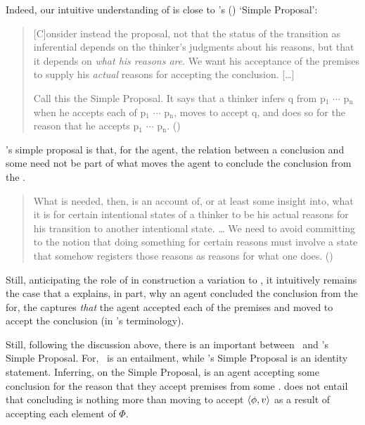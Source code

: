 \begin{note}
  Indeed, our intuitive understanding of \ros{} is close to \citeauthor{Wright:2014tt}'s (\citeyear{Wright:2014tt}) `Simple Proposal':
  \begin{quote}
    [C]onsider instead the proposal, not that the status of the transition as inferential depends on the thinker's judgments about his reasons, but that it depends on \emph{what his reasons are}.
    We want his acceptance of the premises to supply his \emph{actual} reasons for accepting the conclusion.
    [\dots]

    Call this the Simple Proposal.
    It says that a thinker infers q from p\(_{1}\) \(\cdots\) p\(_{\text{n}}\) when he accepts each of p\(_{1}\) \(\cdots\) p\(_{\text{n}}\), moves to accept q, and does so for the reason that he accepts p\(_{1}\) \(\cdots\) p\(_{\text{n}}\).%
    \mbox{}\hfill\mbox{(\citeyear[33]{Wright:2014tt})}
  \end{quote}

  \citeauthor{Wright:2014tt}'s simple proposal is that, for the agent, the relation between a conclusion and some \pool{} need not be part of what moves the agent to conclude the conclusion from the \pool{}.

  \begin{quote}
    What is needed, then, is an account of, or at least some insight into, what it is for certain intentional states of a thinker to be his actual reasons for his transition to another intentional state.
    \dots
    We need to avoid committing to the notion that doing something for certain reasons must involve a state that somehow registers those reasons as reasons for what one does.\newline
    \mbox{}\hfill\mbox{(\citeyear[34]{Wright:2014tt})}
  \end{quote}

  Still, anticipating the role of \ros{} in construction a variation to \qWhy{}, it intuitively remains the case that a \ros{} explains, in part, why an agent concluded the conclusion from the \pool{} for, the \ros{} captures \emph{that} the agent accepted each of the premises and moved to accept the conclusion (in \citeauthor{Wright:2014tt}'s terminology).

  Still, following the discussion above, there is an important between~\supportI{} and \citeauthor{Wright:2014tt}'s Simple Proposal.
  For,~\supportI{} is an entailment, while \citeauthor{Wright:2014tt}'s Simple Proposal is an identity statement.
  Inferring, on the Simple Proposal, is an agent accepting some conclusion for the reason that they accept premises from some \pool{}.
  \supportI{} does not entail that concluding is nothing more than moving to accept \(\langle \phi, v \rangle\) as a result of accepting each element of \(\Phi\).
\end{note}

